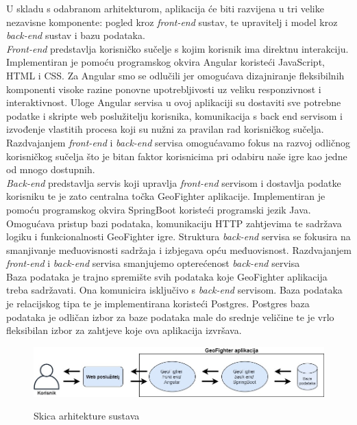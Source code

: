 	\textnormal{U skladu s odabranom arhitekturom, aplikacija će biti razvijena u tri velike nezavisne komponente: pogled kroz \textit{front-end} sustav, te upravitelj i model kroz \textit{back-end} sustav i bazu podataka.}\\
	
	\textnormal{\textit{Front-end} predstavlja korisničko sučelje s kojim korisnik ima direktnu interakciju. Implementiran je pomoću programskog okvira Angular koristeći JavaScript, HTML i CSS. Za Angular smo se odlučili jer omogućava dizajniranje fleksibilnih komponenti visoke razine ponovne upotrebljivosti uz veliku responzivnost i interaktivnost. Uloge Angular servisa u ovoj aplikaciji su dostaviti sve potrebne podatke i skripte web poslužitelju korisnika, komunikacija s back end servisom i izvođenje vlastitih procesa koji su nužni za pravilan rad korisničkog sučelja. Razdvajanjem \textit{front-end} i \textit{back-end} servisa omogućavamo fokus na razvoj odličnog korisničkog sučelja što je bitan faktor korisnicima pri odabiru naše igre kao jedne od mnogo dostupnih.}\\
	
	\textnormal{\textit{Back-end} predstavlja servis koji upravlja \textit{front-end} servisom i dostavlja podatke korisniku te je zato centralna točka GeoFighter aplikacije. Implementiran je pomoću programskog okvira SpringBoot koristeći programski jezik Java. Omogućava pristup bazi podataka, komunikaciju HTTP zahtjevima te sadržava logiku i funkcionalnosti GeoFighter igre. Struktura \textit{back-end} servisa se fokusira na smanjivanje međuovisnosti sadržaja i izbjegava opću međuovisnost. Razdvajanjem \textit{front-end} i \textit{back-end} servisa smanjujemo opterećenost \textit{back-end} servisa}\\
	
	\textnormal{Baza podataka je trajno spremište svih podataka koje GeoFighter aplikacija treba sadržavati. Ona komunicira isključivo s \textit{back-end} servisom. Baza podataka je relacijskog tipa te je implementirana koristeći Postgres. Postgres baza podataka je odličan izbor za baze podataka male do srednje veličine te je vrlo fleksibilan izbor za zahtjeve koje ova aplikacija izvršava.}\\
	
	\begin{figure}[H]
		\centering
		\includegraphics[scale=0.5]{slike/strukturaGF} \\
		\caption{Skica arhitekture sustava}
		\label{fig:arhitekturaGF}
	\end{figure}
	
